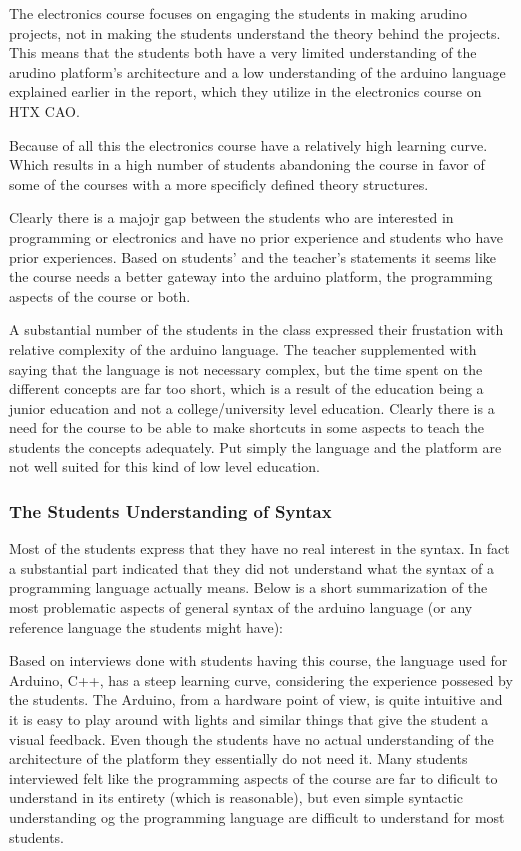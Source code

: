 The electronics course focuses on engaging the students in making arudino projects, not in making the students understand the theory behind the projects. This means that the students both have a very limited understanding of the arudino platform's architecture and a low understanding of the arduino language explained earlier in the report, which they utilize in the electronics course on HTX CAO.

Because of all this the electronics course have a relatively high learning curve. Which results in a high number of students abandoning the course in favor of some of the courses with a more specificly defined theory structures.

Clearly there is a majojr gap between the students who are interested in programming or electronics and have no prior experience and students who have prior experiences. 
Based on students' and the teacher's statements it seems like the course needs a better gateway into the arduino platform, the programming aspects of the course or both.

A substantial number of the students in the class expressed their frustation with relative complexity of the arduino language. The teacher supplemented with saying that the language is not necessary complex, but the time spent on the different concepts are far too short, which is a result of the education being a junior education and not a college/university level education.
Clearly there is a need for the course to be able to make shortcuts in some aspects to teach the students the concepts adequately. Put simply the language and the platform are not well suited for this kind of low level education.

\subsubsection{The Students Understanding of Syntax}
Most of the students express that they have no real interest in the syntax. In fact a substantial part indicated that they did not understand what the syntax of a programming language actually means. Below is a short summarization of the most problematic aspects of general syntax of the arduino language (or any reference language the students might have):


Based on interviews done with students having this course, the language used for Arduino, C++, has a steep learning curve, considering the experience possesed by the students. The Arduino, from a hardware point of view, is quite intuitive and it is easy to play around with lights and similar things that give the student a visual feedback. Even though the students have no actual understanding of the architecture of the platform they essentially do not need it. Many students interviewed felt like the programming aspects of the course are far to dificult to understand in its entirety (which is reasonable), but even simple syntactic understanding og the programming language are difficult to understand for most students. 
\cite{Interviews}%


